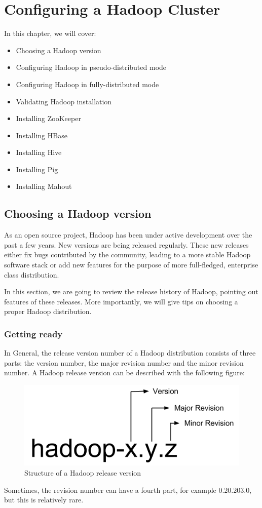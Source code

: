 \chapter{Configuring a Hadoop Cluster}\label{chap:3}
In this chapter, we will cover:

\begin{itemize}
  \item Choosing a Hadoop version
  \item Configuring Hadoop in pseudo-distributed mode
  \item Configuring Hadoop in fully-distributed mode
  \item Validating Hadoop installation
  \item Installing ZooKeeper
  \item Installing HBase
  \item Installing Hive
  \item Installing Pig
  \item Installing Mahout
\end{itemize}

\section{Choosing a Hadoop version}
As an open source project, Hadoop has been under active development over the past a few years. New versions are being released regularly. These new releases either fix bugs contributed by the community, leading to a more stable Hadoop software stack or add new features for the purpose of more full-fledged, enterprise class distribution.

In this section, we are going to review the release history of Hadoop, pointing out features of these releases. More importantly, we will give tips on choosing a proper Hadoop distribution.

\subsection*{Getting ready}
In General, the release version number of a Hadoop distribution consists of three parts: the version number, the major revision number and the minor revision number. A Hadoop release version can be described with the following figure:
\begin{figure}[ht]
  \centering
  \includegraphics[width=.5\textwidth]{figs/5163os_03_01.png}
  \caption{Structure of a Hadoop release version}\label{fig:hadoop.release}
\end{figure} 
Sometimes, the revision number can have a fourth part, for example 0.20.203.0, but this is relatively rare.
